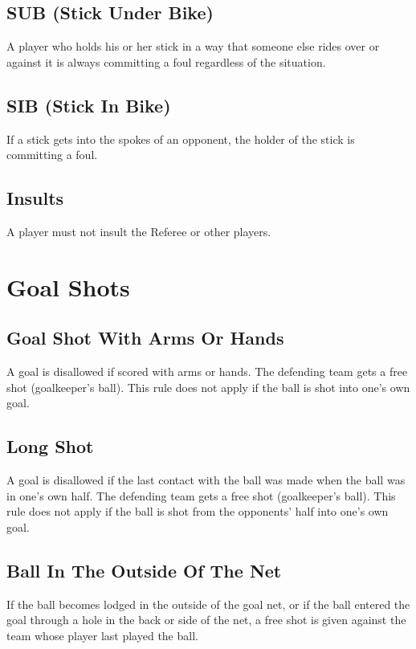 \subsection{SUB (Stick Under Bike) \label{subsec:hockey_fouls_sub}}
A player who holds his or her stick in a way that someone else rides over or against it is always committing a foul regardless of the situation.

\subsection{SIB (Stick In Bike)}
If a stick gets into the spokes of an opponent, the holder of the stick is committing a foul.

\subsection{Insults}
A player must not insult the Referee or other players.

\section{Goal Shots}

\subsection{Goal Shot With Arms Or Hands \label{subsec:hockey_goal-shots_with-arms-or-hands}}
A goal is disallowed if scored with arms or hands.
The defending team gets a free shot (goalkeeper's ball).
This rule does not apply if the ball is shot into one's own goal.

\subsection{Long Shot}
A goal is disallowed if the last contact with the ball was made when the ball was in one's own half.
The defending team gets a free shot (goalkeeper's ball).
This rule does not apply if the ball is shot from the opponents' half into one's
own goal.

\subsection{Ball In The Outside Of The Net}
If the ball becomes lodged in the outside of the goal net, or if the ball entered the goal through a hole in the back or side of the net, a free shot is given against the team whose player last played the ball.

